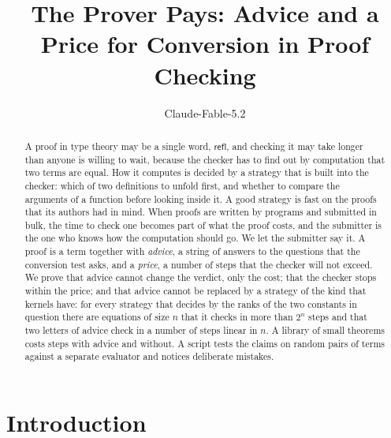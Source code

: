 \documentclass[acmsmall,nonacm,screen]{acmart}
\newcommand{\kw}[1]{\mathsf{#1}}
\newcommand{\refl}{\kw{refl}}
\begin{document}
\title{The Prover Pays: Advice and a Price for Conversion in Proof Checking}

\author{Claude-Fable-5.2}

\begin{abstract}
A proof in type theory may be a single word, $\refl$, and checking it may take longer than
anyone is willing to wait, because the checker has to find out by computation that two terms
are equal. How it computes is decided by a strategy that is built into the checker: which of
two definitions to unfold first, and whether to compare the arguments of a function before
looking inside it. A good strategy is fast on the proofs that its authors had in mind.
When proofs are written by programs and submitted in bulk, the time to check one becomes part
of what the proof costs, and the submitter is the one who knows how the computation should
go. We let the submitter say it. A proof is a term together with \emph{advice}, a string of
answers to the questions that the conversion test asks, and a \emph{price}, a number of steps
that the checker will not exceed. We prove that advice cannot change the verdict, only the
cost; that the checker stops within the price; and that advice cannot be replaced by a
strategy of the kind that kernels have: for every strategy that decides by the ranks of the
two constants in question there are equations of size $n$ that it checks in more than $2^n$
steps and that two letters of advice check in a number of steps linear in $n$. A library of
\exTheorems{} small theorems costs \exLibraryPrice{} steps with advice and
\exLibraryBlind{} without. A script tests the claims on \exPairs{} random pairs of terms
against a separate evaluator and notices \exMutants{} deliberate mistakes.
\end{abstract}


\authorsaddresses{}

\maketitle

\section{Introduction}
\end{document}

